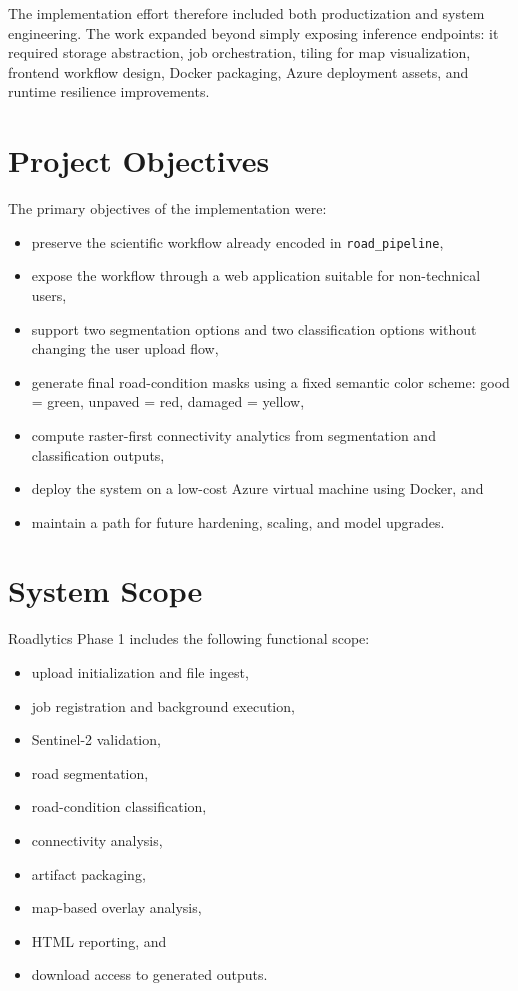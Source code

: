 \documentclass[conference]{IEEEtran}
\begin{document}
The implementation effort therefore included both productization and system
engineering. The work expanded beyond simply exposing inference endpoints: it
required storage abstraction, job orchestration, tiling for map visualization,
frontend workflow design, Docker packaging, Azure deployment assets, and runtime
resilience improvements.

\section{Project Objectives}
The primary objectives of the implementation were:

\begin{itemize}[leftmargin=16pt]
\item preserve the scientific workflow already encoded in
\texttt{road\_pipeline},
\item expose the workflow through a web application suitable for non-technical
users,
\item support two segmentation options and two classification options without
changing the user upload flow,
\item generate final road-condition masks using a fixed semantic color scheme:
good = green, unpaved = red, damaged = yellow,
\item compute raster-first connectivity analytics from segmentation and
classification outputs,
\item deploy the system on a low-cost Azure virtual machine using Docker, and
\item maintain a path for future hardening, scaling, and model upgrades.
\end{itemize}

\section{System Scope}
Roadlytics Phase 1 includes the following functional scope:

\begin{itemize}[leftmargin=16pt]
\item upload initialization and file ingest,
\item job registration and background execution,
\item Sentinel-2 validation,
\item road segmentation,
\item road-condition classification,
\item connectivity analysis,
\item artifact packaging,
\item map-based overlay analysis,
\item HTML reporting, and
\item download access to generated outputs.
\end{itemize}
\end{document}
